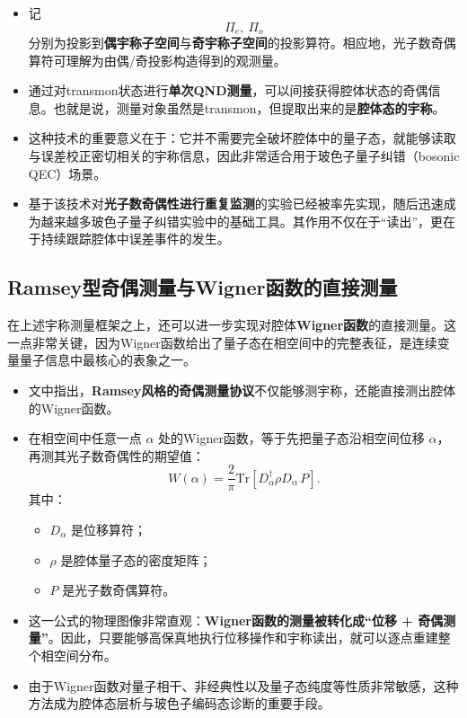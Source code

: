 \documentclass[12pt,a4paper,oneside]{ctexbook}
\begin{document}
\begin{itemize}
    \item 记
    \[
    \Pi_e,\ \Pi_o
    \]
    分别为投影到\textbf{偶宇称子空间}与\textbf{奇宇称子空间}的投影算符。相应地，光子数奇偶算符可理解为由偶/奇投影构造得到的观测量。
    
    \item 通过对transmon状态进行\textbf{单次QND测量}，可以间接获得腔体状态的奇偶信息。也就是说，测量对象虽然是transmon，但提取出来的是\textbf{腔体态的宇称}。
    
    \item 这种技术的重要意义在于：它并不需要完全破坏腔体中的量子态，就能够读取与误差校正密切相关的宇称信息，因此非常适合用于玻色子量子纠错（bosonic QEC）场景。
    
    \item 基于该技术对\textbf{光子数奇偶性进行重复监测}的实验已经被率先实现，随后迅速成为越来越多玻色子量子纠错实验中的基础工具。其作用不仅在于“读出”，更在于持续跟踪腔体中误差事件的发生。
\end{itemize}

\subsection*{Ramsey型奇偶测量与Wigner函数的直接测量}

在上述宇称测量框架之上，还可以进一步实现对腔体\textbf{Wigner函数}的直接测量。这一点非常关键，因为Wigner函数给出了量子态在相空间中的完整表征，是连续变量量子信息中最核心的表象之一。

\begin{itemize}
    \item 文中指出，\textbf{Ramsey风格的奇偶测量协议}不仅能够测宇称，还能直接测出腔体的Wigner函数。
    
    \item 在相空间中任意一点 \(\alpha\) 处的Wigner函数，等于先把量子态沿相空间位移 \(\alpha\)，再测其光子数奇偶性的期望值：
    \[
    W(\alpha)=\frac{2}{\pi}\mathrm{Tr}\!\left[D_\alpha^\dagger \rho D_\alpha\, P\right].
    \]
    其中：
    \begin{itemize}
        \item \(D_\alpha\) 是位移算符；
        \item \(\rho\) 是腔体量子态的密度矩阵；
        \item \(P\) 是光子数奇偶算符。
    \end{itemize}
    
    \item 这一公式的物理图像非常直观：\textbf{Wigner函数的测量被转化成“位移 + 奇偶测量”}。因此，只要能够高保真地执行位移操作和宇称读出，就可以逐点重建整个相空间分布。
    
    \item 由于Wigner函数对量子相干、非经典性以及量子态纯度等性质非常敏感，这种方法成为腔体态层析与玻色子编码态诊断的重要手段。
\end{itemize}
\end{document}
